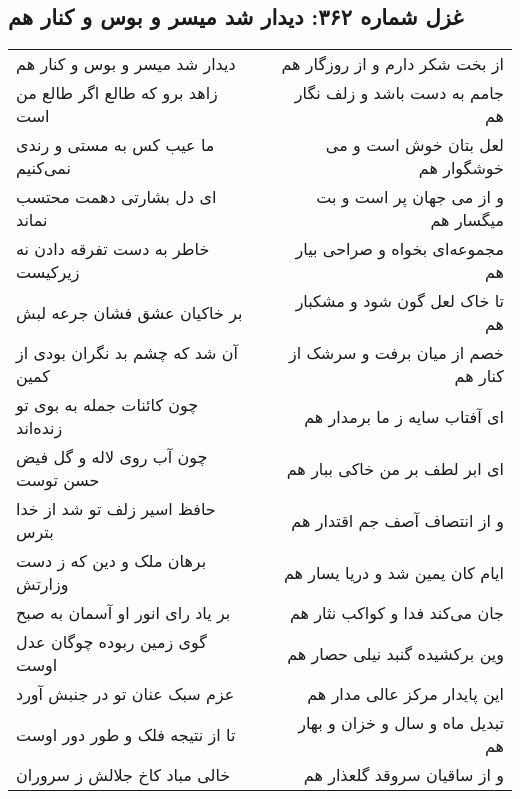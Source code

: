 \begin{center}
\section*{غزل شماره ۳۶۲: دیدار شد میسر و بوس و کنار هم}
\label{sec:sh362}
\begin{longtable}{l p{0.5cm} r}
دیدار شد میسر و بوس و کنار هم
&&
از بخت شکر دارم و از روزگار هم
\\
زاهد برو که طالع اگر طالع من است
&&
جامم به دست باشد و زلف نگار هم
\\
ما عیب کس به مستی و رندی نمی‌کنیم
&&
لعل بتان خوش است و می خوشگوار هم
\\
ای دل بشارتی دهمت محتسب نماند
&&
و از می جهان پر است و بت میگسار هم
\\
خاطر به دست تفرقه دادن نه زیرکیست
&&
مجموعه‌ای بخواه و صراحی بیار هم
\\
بر خاکیان عشق فشان جرعه لبش
&&
تا خاک لعل گون شود و مشکبار هم
\\
آن شد که چشم بد نگران بودی از کمین
&&
خصم از میان برفت و سرشک از کنار هم
\\
چون کائنات جمله به بوی تو زنده‌اند
&&
ای آفتاب سایه ز ما برمدار هم
\\
چون آب روی لاله و گل فیض حسن توست
&&
ای ابر لطف بر من خاکی ببار هم
\\
حافظ اسیر زلف تو شد از خدا بترس
&&
و از انتصاف آصف جم اقتدار هم
\\
برهان ملک و دین که ز دست وزارتش
&&
ایام کان یمین شد و دریا یسار هم
\\
بر یاد رای انور او آسمان به صبح
&&
جان می‌کند فدا و کواکب نثار هم
\\
گوی زمین ربوده چوگان عدل اوست
&&
وین برکشیده گنبد نیلی حصار هم
\\
عزم سبک عنان تو در جنبش آورد
&&
این پایدار مرکز عالی مدار هم
\\
تا از نتیجه فلک و طور دور اوست
&&
تبدیل ماه و سال و خزان و بهار هم
\\
خالی مباد کاخ جلالش ز سروران
&&
و از ساقیان سروقد گلعذار هم
\\
\end{longtable}
\end{center}
